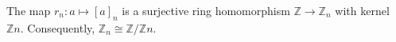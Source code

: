 The map $r_n: a \mapsto [a]_n$ is a surjective ring homomorphism $\mathbb{Z} \rightarrow \mathbb{Z}_n$ with kernel $\mathbb{Z}n$. Consequently, $\mathbb{Z}_n \cong \mathbb{Z}/\mathbb{Z}n$.
